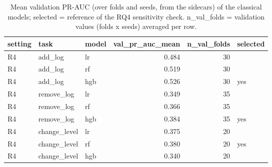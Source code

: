 \begin{table}[htbp]
\centering
\small
\caption{Mean validation PR-AUC (over folds and seeds, from the sidecars) of the classical models; selected = reference of the RQ4 sensitivity check. n\_val\_folds = validation values (folds x seeds) averaged per row.}
\label{tab:rq4_did_reference_validation}
\begin{tabular}{lllrrl}
\toprule
setting & task & model & val\_pr\_auc\_mean & n\_val\_folds & selected \\
\midrule
R4 & add\_log & lr & 0.484 & 30 &  \\
R4 & add\_log & rf & 0.519 & 30 &  \\
R4 & add\_log & hgb & 0.526 & 30 & yes \\
R4 & remove\_log & lr & 0.349 & 35 &  \\
R4 & remove\_log & rf & 0.366 & 35 &  \\
R4 & remove\_log & hgb & 0.384 & 35 & yes \\
R4 & change\_level & lr & 0.375 & 20 &  \\
R4 & change\_level & rf & 0.380 & 20 & yes \\
R4 & change\_level & hgb & 0.340 & 20 &  \\
\bottomrule
\end{tabular}
\end{table}
